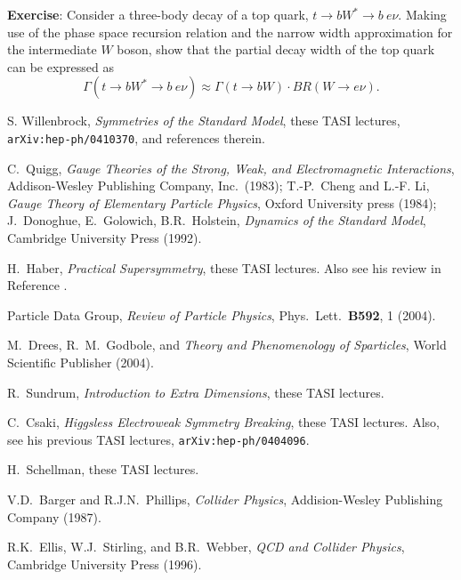 \documentclass[12pt,prd,aps,floats,preprintnumbers,preprint,superscriptaddress,floatfix,nofootinbib]{revtex4}
\def\be{\begin{equation}}
\def\ee{\end{equation}}
\begin{document}
 {
\vskip 0.2cm
\noindent
{\bf Exercise}: Consider a three-body decay of a top quark, 
$t\to bW^* \to b\ e\nu.$
Making use of the phase space recursion relation and the narrow 
width approximation for the intermediate $W$ boson, show that the
partial decay width of the top quark can be expressed as
\be
\Gamma(t\to b W^* \to b\ e\nu) \approx \Gamma(t\to bW)\cdot BR(W\to e\nu).
\ee
\vskip 0.2cm
}


\begin{thebibliography}{99}

S. Willenbrock, {\it Symmetries of the Standard Model}, 
these TASI lectures, {\tt arXiv:hep-ph/0410370}, and references therein.

C.~Quigg, {\it Gauge Theories of the Strong, 
Weak, and Electromagnetic Interactions}, Addison-Wesley Publishing
Company, Inc.~(1983); 
T.-P.~Cheng and L.-F. Li, {\it Gauge Theory of Elementary
Particle Physics}, Oxford University press (1984);
J.~Donoghue, E.~Golowich, B.R.~Holstein,
{\it Dynamics of the Standard Model}, Cambridge University Press (1992).

H.~Haber, {\it Practical Supersymmetry}, 
these TASI lectures. Also see his review in Reference \cite{PDG}.

 Particle Data Group, {\it Review of Particle  Physics},
Phys.~Lett.~{\bf B592}, 1 (2004).

M.~Drees, R.~M.~Godbole, and  {\it Theory and
Phenomenology of Sparticles}, World Scientific Publisher (2004).

R.~Sundrum, {\it Introduction to Extra Dimensions}, 
these TASI lectures.

C.~Csaki, {\it Higgsless Electroweak 
Symmetry Breaking}, these TASI lectures. Also, see his previous
TASI lectures, {\tt arXiv:hep-ph/0404096}.

H.~Schellman, these TASI lectures.

 V.D.~Barger and R.J.N.~Phillips, {\it Collider Physics}, 
Addision-Wesley Publishing Company (1987).

 R.K.~Ellis, W.J.~Stirling, and B.R.~Webber, 
{\it QCD and Collider Physics}, 
Cambridge University Press (1996).


\end{thebibliography}
\end{document}

